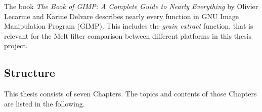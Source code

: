 \documentclass[../MasterThesis.tex]{subfiles}
\begin{document}
\begin{description}[font=\color{RedViolet!80!black}, style=nextline]
		
		
		
		
		
		
		
		
		
		\newpage
		
		\item[GIMP]
		
		
		The book \textit{The Book of GIMP: A Complete Guide to Nearly Everything} by Olivier Lecarme and Karine Delvare describes nearly every function in GNU Image Manipulation Program (GIMP). This includes the \textit{grain extract} function, that is relevant for the Melt filter comparison between different platforms in this thesis project.~\cite{gimp}
		
		
		
		
		
		
	\end{description}
	
	
	
	
	
	
	
	
	
	\subsection{Structure} \label{subsection:structure}
	
	This thesis consists of seven Chapters. The topics and contents of those Chapters are listed in the following.
	
\end{document}
